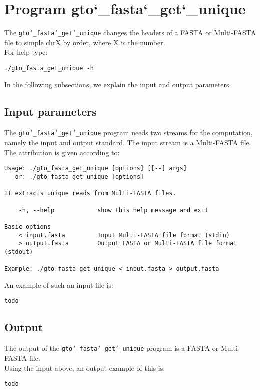 \section{Program gto\char`_fasta\char`_get\char`_unique}
The \texttt{gto\char`_fasta\char`_get\char`_unique} changes the headers of a FASTA or Multi-FASTA file to simple chrX by order, where X is the number.\\
For help type:
\begin{lstlisting}
./gto_fasta_get_unique -h
\end{lstlisting}
In the following subsections, we explain the input and output parameters.

\subsection*{Input parameters}

The \texttt{gto\char`_fasta\char`_get\char`_unique} program needs two streams for the computation, namely the input and output standard. The input stream is a Multi-FASTA file.\\
The attribution is given according to:
\begin{lstlisting}
Usage: ./gto_fasta_get_unique [options] [[--] args]
   or: ./gto_fasta_get_unique [options]

It extracts unique reads from Multi-FASTA files.

    -h, --help            show this help message and exit

Basic options
    < input.fasta         Input Multi-FASTA file format (stdin)
    > output.fasta        Output FASTA or Multi-FASTA file format (stdout)

Example: ./gto_fasta_get_unique < input.fasta > output.fasta
\end{lstlisting}
An example of such an input file is:
\begin{lstlisting}
todo
\end{lstlisting}

\subsection*{Output}
The output of the \texttt{gto\char`_fasta\char`_get\char`_unique} program is a FASTA or Multi-FASTA file.\\
Using the input above, an output example of this is:
\begin{lstlisting}
todo
\end{lstlisting}
